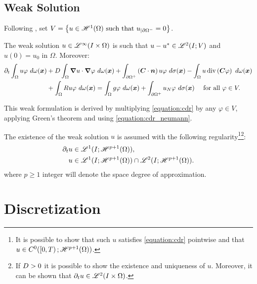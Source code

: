 \newpage
\subsection{Weak Solution}

Following \cite{Feistauer2004}, set $V = \left\{ u \in \mathscr{H}^{1}(\Omega) \text{ such that } u_{\mid \partial \Omega^-} = 0 \right\}$.

\begin{definition}
    The weak solution $u \in \mathscr{L}^{\infty}(I \times \Omega)$ is such that $u - u^* \in \mathscr{L}^{2}(I; V)$ and $u(0) = u_0$ in $\Omega$. Moreover:
    \begin{align}
        \partial_t \int_{\Omega} u \varphi ~ d \omega(\bm{x}) &+ D \int_{\Omega} \bm{\nabla} u \cdot \bm{\nabla} \varphi ~ d \omega(\bm{x}) + \int_{\partial \Omega^+} \left( \bm{C} \cdot \bm{n} \right) u \varphi ~ d \sigma(\bm{x}) - \int_{\Omega} u \operatorname*{div} \left( \bm{C} \varphi \right) ~ d \omega(\bm{x}) \notag \\
        &+ \int_{\Omega} R u \varphi ~ d \omega(\bm{x}) = \int_{\Omega} g \varphi ~ d \omega(\bm{x}) + \int_{\partial \Omega^+} u_N \varphi ~ d \sigma(\bm{x}) \quad \text{ for all } \varphi \in V.
    \end{align}
\end{definition}
This weak formulation is derived by multiplying \cref{equation:cdr} by any $\varphi \in V$, applying Green's theorem and using \cref{equation:cdr_neumann}. %

The existence of the weak solution $u$ is assumed with the following regularity\footnote{It is possible to show that such $u$ satisfies \cref{equation:cdr} pointwise and that $u \in C^0(\left[ 0, T \right); \mathscr{H}^{p + 1}(\Omega))$.}\footnote{If $D > 0$ it is possible to show the existence and uniqueness of $u$. Moreover, it can be shown that $\partial_t u \in \mathscr{L}^{2}(I \times \Omega)$.}: %
\begin{align}
    \partial_t u & \in \mathscr{L}^{1}(I; \mathscr{H}^{p + 1}(\Omega)), \label{equation:assumption_regularity_1} \\
    u & \in \mathscr{L}^{1}(I; \mathscr{H}^{p + 1}(\Omega)) \cap \mathscr{L}^{2}(I; \mathscr{H}^{p + 1}(\Omega)). \label{equation:assumption_regularity_2}
\end{align}
where $p \geq 1$ integer will denote the space degree of approximation.

\newpage
\section{Discretization}

